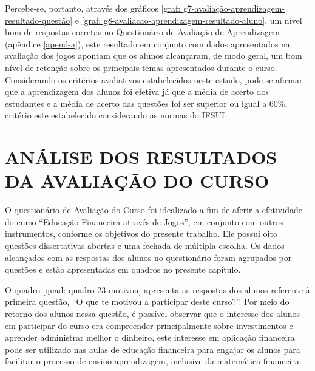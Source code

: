 Percebe-se, portanto, através dos gráficos \ref{graf: g7-avaliação-aprendizagem-resultado-questão} e \ref{graf: g8-avaliacao-aprendizagem-resultado-aluno}, um nível bom de respostas corretas no Questionário de Avaliação de Aprendizagem (apêndice \ref{apend-a}), este resultado em conjunto com dados apresentados na avaliação dos jogos apontam que os alunos alcançaram, de modo geral, um bom nível de retenção sobre os principais temas apresentados durante o curso. Considerando os critérios avaliativos estabelecidos neste estudo, pode-se afirmar que a aprendizagem dos alunos foi efetiva já que a média de acerto dos estudantes e a média de acerto das questões foi ser superior ou igual a 60\%, critério este estabelecido considerando as normas do IFSUL.

\section{ANÁLISE DOS RESULTADOS DA AVALIAÇÃO DO CURSO}
O questionário de Avaliação do Curso foi idealizado a fim de aferir a efetividade do curso “Educação Financeira através de Jogos”, em conjunto com outros instrumentos, conforme os objetivos do presente trabalho. Ele possui oito questões dissertativas abertas e uma fechada de múltipla escolha. Os dados alcançados com as respostas dos alunos no questionário foram agrupados por questões e estão apresentadas em quadros no presente capítulo.

O quadro \ref{quad: quadro-23-motivou} apresenta as respostas dos alunos referente à primeira questão, “O que te motivou a participar deste curso?”. Por meio do retorno dos alunos nessa questão, é possível observar que o interesse dos alunos em participar do curso era compreender principalmente sobre investimentos e aprender administrar melhor o dinheiro, este interesse em aplicação financeira pode ser utilizado nas aulas de educação financeira para engajar os alunos para facilitar o processo de ensino-aprendizagem, inclusive da matemática financeira.


